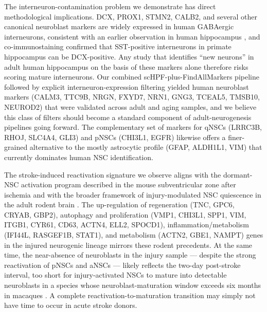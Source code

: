 \documentclass[11pt]{article}
\begin{document}
The interneuron-contamination problem we demonstrate has direct
methodological implications. DCX, PROX1, STMN2, CALB2, and several other
canonical neuroblast markers are widely expressed in human GABAergic
interneurons, consistent with an earlier observation in human hippocampus
\cite{franjic2022transcriptomic}, and co-immunostaining confirmed that
SST-positive interneurons in primate hippocampus can be DCX-positive.
Any study that identifies ``new neurons'' in adult human hippocampus on
the basis of these markers alone therefore risks scoring mature
interneurons. Our combined scHPF-plus-FindAllMarkers pipeline followed by
explicit interneuron-expression filtering yielded human neuroblast markers
(CALM3, TTC9B, NRGN, FXYD7, NRN1, GNG3, TCEAL5, TMSB10, NEUROD2) that
were validated across adult and aging samples, and we believe this class
of filters should become a standard component of adult-neurogenesis
pipelines going forward. The complementary set of markers for qNSCs
(LRRC3B, RHOJ, SLC4A4, GLI3) and pNSCs (CHI3L1, EGFR) likewise offers a
finer-grained alternative to the mostly astrocytic profile (GFAP, ALDH1L1,
VIM) that currently dominates human NSC identification.

The stroke-induced reactivation signature we observe aligns with the
dormant-NSC activation program described in the mouse subventricular zone
after ischemia \cite{llorensbobadilla2015single} and with the broader
framework of injury-modulated NSC quiescence in the adult rodent brain
\cite{obernier2019neural,urban2019quiescence}. The up-regulation of
regeneration (TNC, GPC6, CRYAB, GBP2), autophagy and proliferation
(VMP1, CHI3L1, SPP1, VIM, ITGB1, CYR61, CD63, ACTN4, ELL2, SPOCD1),
inflammation/metabolism (IFI44L, RASGEF1B, STAT1), and metabolism (ACTN2,
GBE1, NAMPT) genes in the injured neurogenic lineage mirrors these
rodent precedents. At the same time, the near-absence of neuroblasts in
the injury sample --- despite the strong reactivation of pNSCs and aNSCs
--- likely reflects the two-day post-stroke interval, too short for
injury-activated NSCs to mature into detectable neuroblasts in a species
whose neuroblast-maturation window exceeds six months in macaques
\cite{kohler2011maturation}. A complete reactivation-to-maturation
transition may simply not have time to occur in acute stroke donors.
\end{document}
